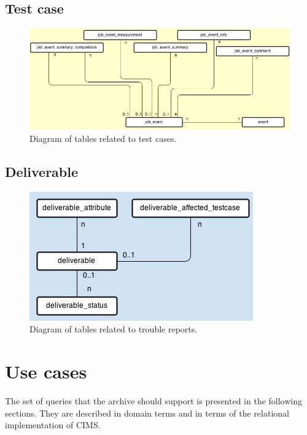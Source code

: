 \subsection{Test case}
\begin{figure}[h!]
\centering
\includegraphics[scale=0.5]{figure/job_event.jpg}
\caption{Diagram of tables related to test cases.}
\label{fig:job_event}
\end{figure}

\subsection{Deliverable}
\begin{figure}[h!]
\centering
\includegraphics[scale=0.5]{figure/deliverable.jpg}
\caption{Diagram of tables related to trouble reports.}
\label{fig:deliverable}
\end{figure}




\section{Use cases}
The set of queries that the archive should support is presented in the following sections. They are described in domain terms and in terms of the relational implementation of CIMS.


